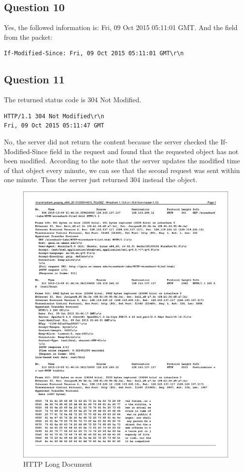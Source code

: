 \documentclass[titlepage, paper=a4, fontsize=11pt]{scrartcl} %
\numberwithin{equation}{section} %
\numberwithin{figure}{section} %
\numberwithin{table}{section} %
\begin{document}
\subsection*{Question 10}
Yes, the followed information is: Fri, 09 Oct 2015 05:11:01 GMT.
And the field from the packet:
\begin{verbatim}
If-Modified-Since: Fri, 09 Oct 2015 05:11:01 GMT\r\n
\end{verbatim}


\subsection*{Question 11}
The returned status code is 304 Not Modified.
\begin{verbatim}
HTTP/1.1 304 Not Modified\r\n
Fri, 09 Oct 2015 05:11:47 GMT
\end{verbatim}
No, the server did not return the content because the server checked the
If-Modified-Since field in the request and found that the requested object
has not been modified. According to the note that the server updates the
modified time of that object every minute, we can see that the second request
was sent within one minute. Thus the server just returned 304 instead the object.

\newpage


\begin{figure}[!ht]
    \includegraphics[width=\textwidth]{images/longobj.pdf}
    \caption{HTTP Long Document}
    \label{fig:longobj}
\end{figure}
\end{document}
